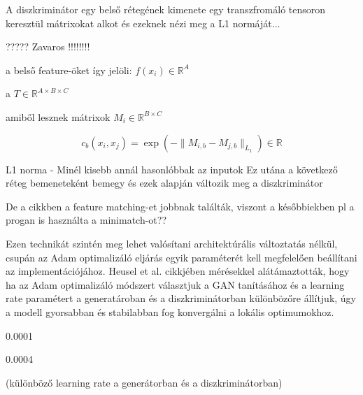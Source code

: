 A diszkriminátor egy belső rétegének kimenete egy transzfromáló tensoron keresztül mátrixokat alkot és ezeknek nézi meg a L1 normáját...


????? Zavaros !!!!!!!!

a belső feature-öket így jelöli: $f(x_i) \in \mathbb{R}^A $

a $T \in \mathbb{R}^{A \times B \times C} $

amiből lesznek mátrixok $M_i \in \mathbb{R}^{B \times C}$

$$ c_b(x_i, x_j) = \exp(- \|M_{i,b} - M_{j,b}\|_{L_1}) \in \mathbb{R} $$

L1 norma - Minél kisebb annál hasonlóbbak az inputok
Ez utána a következő réteg bemeneteként bemegy és ezek alapján változik meg a diszkriminátor

De a cikkben a feature matching-et jobbnak találták, viszont a későbbiekben pl a progan is használta a minimatch-ot??

Ezen technikát szintén meg lehet valósítani architektúrális változtatás nélkül, csupán az Adam optimalizáló eljárás egyik paraméterét kell megfelelően beállítani az implementációjához.
Heusel et al. \cite{heusel2017gans} cikkjében mérésekkel alátámaztották, hogy ha az Adam optimalizáló módszert választjuk a GAN tanításához és a learning rate paramétert a generatároban és a diszkriminátorban különbözőre állítjuk, úgy a modell gyorsabban és stabilabban fog konvergálni a lokális optimumokhoz.

0.0001

0.0004

(különböző learning rate a generátorban és a diszkriminátorban)